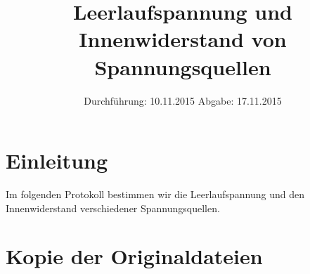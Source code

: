 

\subject{V301}
\title{Leerlaufspannung und Innenwiderstand von Spannungsquellen}
\date{
  Durchführung: 10.11.2015
  \hspace{3em}
  Abgabe: 17.11.2015
}



\maketitle
\thispagestyle{empty}
\tableofcontents
\newpage

\section{Einleitung}
Im folgenden Protokoll bestimmen wir die Leerlaufspannung und den Innenwiderstand
verschiedener Spannungsquellen.






\nocite{anleitung}

\printbibliography

\newpage

\appendix

\section{Kopie der Originaldateien}



